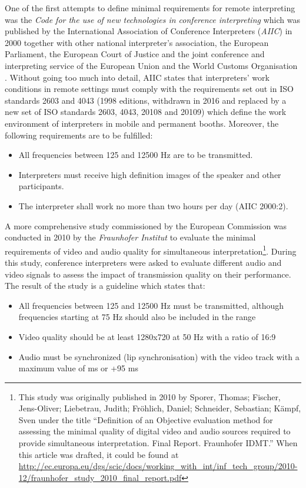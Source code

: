 \documentclass[output=paper]{langsci/langscibook}
\begin{document}
One of the first attempts to define minimal requirements for remote interpreting was the \textit{Code for the use of new technologies in conference interpreting} which was published by the International Association of Conference Interpreters (\textit{AIIC}) in 2000 together with other national interpreter’s association, the European Parliament, the European Court of Justice and the joint conference and interpreting service of the European Union and the World Customs Organisation \citep[31]{Korak2010}. Without going too much into detail, AIIC states that interpreters’ work conditions in remote settings must comply with the requirements set out in ISO standards 2603 and 4043 (1998 editions, withdrawn in 2016 and replaced by a new set of ISO standards 2603, 4043, 20108 and 20109) which define the work environment of interpreters in mobile and permanent booths. Moreover, the following requirements are to be fulfilled:

\begin{itemize}
\item All frequencies between 125 and 12500 Hz are to be transmitted.
\item Interpreters must receive high definition images of the speaker and other participants. 
\item The interpreter shall work no more than two hours per day (AIIC 2000:2).
\end{itemize}

A more comprehensive study commissioned by the European Commission was conducted in 2010 by the \textit{Fraunhofer Institut} to evaluate the minimal requirements of video and audio quality for simultaneous interpretation\footnote{This study was originally published in 2010 by Sporer, Thomas; Fischer, Jens-Oliver; Liebetrau, Judith; Fröhlich, Daniel; Schneider, Sebastian; Kämpf, Sven under the title “Definition of an Objective evaluation method for assessing the minimal quality of digital video and audio sources required to provide simultaneous interpretation. Final Report. Fraunhofer IDMT.” When this article was drafted, it could be found at \url{http://ec.europa.eu/dgs/scic/docs/working_with_int/inf_tech_group/2010-12/fraunhofer_study_2010_final_report.pdf}}. During this study, conference interpreters were asked to evaluate different audio and video signals to assess the impact of transmission quality on their performance. The result of the study is a guideline which states that:

\begin{itemize}
\item All frequencies between 125 and 12500 Hz must be transmitted, although frequencies starting at 75 Hz should also be included in the range
\item Video quality should be at least 1280x720 at 50 Hz with a ratio of 16:9
\item Audio must be synchronized (lip synchronisation) with the video track with a maximum value of  ms or +95 ms
\end{itemize}
\end{document}
